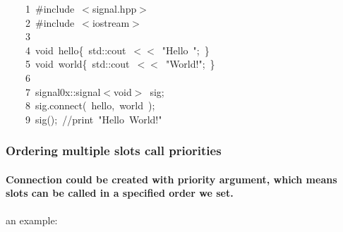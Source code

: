 \documentclass[9pt,onside,a4paper]{article}
\newcommand{\hlstd}[1]{\textcolor[rgb]{0.2,0,0.4}{#1}}
\newcommand{\hlstr}[1]{\textcolor[rgb]{0.09,0.38,0.65}{#1}}
\newcommand{\hlslc}[1]{\textcolor[rgb]{0,0.4,0.2}{#1}}
\newcommand{\hlppc}[1]{\textcolor[rgb]{0.33,0.45,0.69}{#1}}
\newcommand{\hlopt}[1]{\textcolor[rgb]{0.33,0.33,0.33}{#1}}
\newcommand{\hllin}[1]{\textcolor[rgb]{0.6,0.6,0.6}{#1}}
\newcommand{\hlkwb}[1]{\textcolor[rgb]{0.96,0.55,0.14}{#1}}
\newcommand{\hlkwd}[1]{\textcolor[rgb]{0.82,0.11,0.93}{#1}}
\begin{document}
\noindent
\ttfamily
\hlstd{}\hllin{\ \ \ \ 1\ }\hlppc{\#include\ $<$signal.hpp$>$}\\
\hllin{\ \ \ \ 2\ }\hlstd{}\hlppc{\#include\ $<$iostream$>$}\\
\hllin{\ \ \ \ 3\ }\hlstd{}\\
\hllin{\ \ \ \ 4\ }\hlkwb{void\ }\hlstd{hello}\hlopt{\{\ }\hlstd{std}\hlopt{::}\hlstd{cout\ }\hlopt{$<$$<$\ }\hlstd{}\hlstr{"Hello\ "}\hlstd{}\hlopt{;\ \}}\\
\hllin{\ \ \ \ 5\ }\hlstd{}\hlkwb{void\ }\hlstd{world}\hlopt{\{\ }\hlstd{std}\hlopt{::}\hlstd{cout\ }\hlopt{$<$$<$\ }\hlstd{}\hlstr{"World!"}\hlstd{}\hlopt{;\ \}}\\
\hllin{\ \ \ \ 6\ }\hlstd{\\
\hllin{\ \ \ \ 7\ }signal0x}\hlopt{::}\hlstd{signal}\hlopt{$<$}\hlstd{}\hlkwb{void}\hlstd{}\hlopt{$>$\ }\hlstd{sig}\hlopt{;}\\
\hllin{\ \ \ \ 8\ }\hlstd{sig}\hlopt{.}\hlstd{}\hlkwd{connect}\hlstd{}\hlopt{(\ }\hlstd{hello}\hlopt{,\ }\hlstd{world\ }\hlopt{);}\\
\hllin{\ \ \ \ 9\ }\hlstd{}\hlkwd{sig}\hlstd{}\hlopt{();\ }\hlstd{}\hlslc{//print\ "Hello\ World!"}\hlstd{}\\
\mbox{}
\normalfont
\normalsize

\subsubsection{Ordering multiple slots call priorities}

\paragraph{Connection could be created with priority argument, which means slots can be called in a specified order we set. \\}
an example: \\
\end{document}
